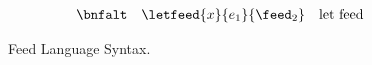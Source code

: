 \begin{figure}[t]
\[\begin{array}{lll}
 \bnfalt & \letfeed{x}{e_1}{\feed_2} & \mbox{let feed} \\
\end{array}
\]
\caption{Feed Language Syntax.}
\label{fig:syntax}
\end{figure}

